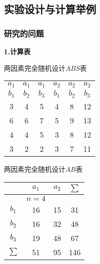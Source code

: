 \subsection{实验设计与计算举例}
\subsubsection{研究的问题}

\textbf{1.计算表}

\begin{margintable}
  \centering
  \caption{两因素完全随机设计$ABS$表}
  \label{two_random_ABS}
    \begin{tabular}{cccccc}
    \toprule
        $a_1$ & $a_1$ & $a_1$ & $a_2$ & $a_2$ & $a_2$ \\
        $b_1$ & $b_2$ & $b_3$ & $b_1$ & $b_2$ & $b_3$ \\
    \midrule
        \rowcolor[rgb]{ .867,  .922,  .969} 3     & 4     & 5     & 4     & 8     & 12 \\
        \rowcolor[rgb]{ .867,  .922,  .969} 6     & 6     & 7     & 5     & 9     & 13 \\
        \rowcolor[rgb]{ .867,  .922,  .969} 4     & 4     & 5     & 3     & 8     & 12 \\
        \rowcolor[rgb]{ .867,  .922,  .969} 3     & 2     & 2     & 3     & 7     & 11 \\
    \bottomrule
    \end{tabular}
\end{margintable}

\begin{margintable}
  \centering
  \caption{两因素完全随机设计$AB$表}
  \label{two_random_AB}
    \begin{tabular}{c|cc|c}
    \toprule
          & $a_1$ & $a_2$ & $\sum$ \\
    \midrule
          & $n=4$ &       &  \\
    $b_1$ & \cellcolor[rgb]{ 1,  .949,  .8}16 & \cellcolor[rgb]{ 1,  .949,  .8}15 & \cellcolor[rgb]{ .886,  .937,  .855}31 \\
    $b_2$ & \cellcolor[rgb]{ 1,  .949,  .8}16 & \cellcolor[rgb]{ 1,  .949,  .8}32 & \cellcolor[rgb]{ .886,  .937,  .855}48 \\
    $b_3$ & \cellcolor[rgb]{ 1,  .949,  .8}19 & \cellcolor[rgb]{ 1,  .949,  .8}48 & \cellcolor[rgb]{ .886,  .937,  .855}67 \\
    \midrule
    $\sum$ & \cellcolor[rgb]{ .929,  .929,  .929}51 & \cellcolor[rgb]{ .929,  .929,  .929}95 & \cellcolor[rgb]{ .851,  .882,  .949}146 \\
    \bottomrule
    \end{tabular}
\end{margintable}


